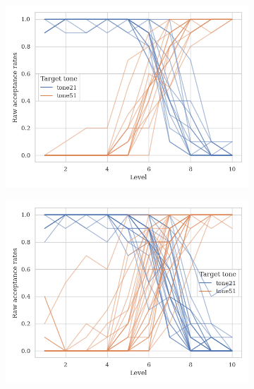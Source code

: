 \begin{figure}[hbt!]
\centering
\begin{subfigure}[b]{.45\textwidth}
\centering
\includegraphics[width=\textwidth]{figures/E3/Mandarin_monolingual_E3_raw.png}
\end{subfigure}
\hfill
\begin{subfigure}[b]{.45\textwidth}
\centering
\includegraphics[width=\textwidth]{figures/E3/Mandarin_bilingual_E3_raw.png}
\end{subfigure}
\hfill
\begin{subfigure}[b]{.45\textwidth}
\centering

\end{subfigure}
\end{figure}
